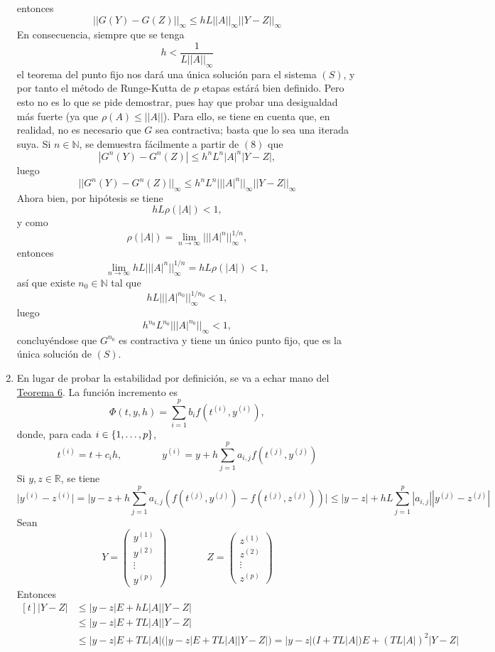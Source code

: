 \documentclass[11pt]{report}
\makeatletter
\renewenvironment{proof}[1][\proofname]{\par
  \pushQED{\qed}%
  \normalfont \topsep\z@skip %
  \trivlist
  \item[\hskip\labelsep
        \itshape
    #1\@addpunct{.}]\ignorespaces
}{%
  \popQED\endtrivlist\@endpefalse
}
\theoremstyle{mytheorem}
\theoremstyle{mydefinition}
\theoremstyle{myexample}
\let\oldproofname=\proofname
\renewcommand{\proofname}{\rm\bf{\oldproofname}}}
\newcommand{\R}{\mathbb R}
\newcommand{\N}{\mathbb N}
\newcommand{\pars}[1]{\left( #1 \right)}
\newcommand{\bars}[1]{\left| #1 \right|}
\newcommand{\norm}[1]{\left|\left| #1 \right|\right|}
\makeatother
\begin{document}
\begin{proof}
\begin{enumerate}
entonces
\[\norm{G(Y)-G(Z)}_{\infty} \leq hL\norm{A}_{\infty}\norm{Y-Z}_{\infty}\]
En consecuencia, siempre que se tenga
\[h < \frac{1}{L||A||_{\infty}}\]
el teorema del punto fijo nos dará una única solución para el sistema $(S)$, y por tanto el método de Runge-Kutta de $p$ etapas estárá bien definido. Pero esto no es lo que se pide demostrar, pues hay que probar una desigualdad más fuerte (ya que $\rho(A) \leq ||A||$). Para ello, se tiene en cuenta que, en realidad, no es necesario que $G$ sea contractiva; basta que lo sea una iterada suya. Si $n \in \N$, se demuestra fácilmente a partir de $(8)$ que
\[|G^n(Y)-G^n(Z)| \leq h^nL^n|A|^n|Y-Z|,\]
luego
\[||G^n(Y)-G^n(Z)||_{\infty} \leq h^nL^n|||A|^n||_{\infty}||Y-Z||_{\infty}\]
Ahora bien, por hipótesis se tiene
\[hL\rho(|A|) < 1,\]
y como
\[\rho(|A|) = \lim_{n \to \infty} |||A|^n||_{\infty}^{1/n},\]
entonces
\[\lim_{n \to \infty} hL|||A|^n||_{\infty}^{1/n} = hL\rho(|A|) < 1,\]
así que existe $n_0 \in \N$ tal que
\[hL|||A|^{n_0}||_{\infty}^{1/n_0} < 1,\]
luego
\[h^{n_0}L^{n_0}|||A|^{n_0}||_{\infty} < 1,\]
concluyéndose que $G^{n_0}$ es contractiva y tiene un único punto fijo, que es la única solución de $(S)$.
\item En lugar de probar la estabilidad por definición, se va a echar mano del \hyperref[teo2.7]{\color{gray}Teorema 6}. La función incremento es
\[\Phi(t,y,h) = \sum_{i=1}^p b_if(t^{(i)},y^{(i)}),\]
donde, para cada $i\in \{ 1,\mathellipsis,p\}$,
\[t^{(i)}=t+c_ih, \qquad \qquad y^{(i)} = y+h\sum_{j=1}^p a_{i,j}f(t^{(j)},y^{(j)})\]
Si $y,z \in \R$, se tiene
\[\bigl|y^{(i)} - z^{(i)}\bigr| = \biggl|{y-z+h\sum_{j=1}^pa_{i,j}(f(t^{(j)},y^{(j)})-f(t^{(j)},z^{(j)}))}\biggr| \leq \bars{y-z}+hL\sum_{j=1}^p |a_{i,j}||y^{(j)}-z^{(j)}|\]
Sean
\[Y = \pars{\begin{array}{c}
     y^{(1)} \\
     y^{(2)} \\
     \vdots \\
     y^{(p)}
\end{array}} \qquad \qquad Z = \pars{\begin{array}{c}
     z^{(1)} \\
     z^{(2)} \\
     \vdots \\
     z^{(p)}
\end{array}}\]
Entonces
\[\begin{aligned}[t]
    |Y-Z| &\leq |y-z|E+hL|A||Y-Z| \\
    &\leq |y-z|E+TL|A||Y-Z| \\
    &\leq |y-z|E+TL|A|\bigl(|y-z|E+TL|A||Y-Z|\bigr) = |y-z|\bigl(I+TL|A|\bigr)E+(TL|A|)^2|Y-Z|

\end{aligned}\]
\end{enumerate}
\end{proof}
\end{document}
